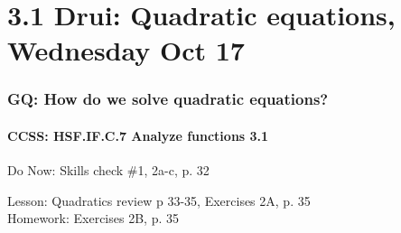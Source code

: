 \documentclass{beamer}
\begin{document}
\section{3.1 Drui: Quadratic equations, Wednesday Oct 17}
  \frame
  {
    \frametitle{GQ: How do we solve quadratic equations?}
    \framesubtitle{CCSS: HSF.IF.C.7 Analyze functions    \alert{3.1}}

    \begin{block}{Do Now: Skills check \#1, 2a-c, p. 32}
    \end{block}
    Lesson: Quadratics review p 33-35, Exercises 2A, p. 35 \\
    Homework: Exercises 2B, p. 35
  }
\end{document}
